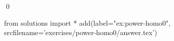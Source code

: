 
\begin{ex} 
  \label{ex:power-homo0}
  
  \qed
\end{ex} 
\begin{python0}
from solutions import *
add(label="ex:power-homo0",
    srcfilename='exercises/power-homo0/answer.tex') 
\end{python0}
